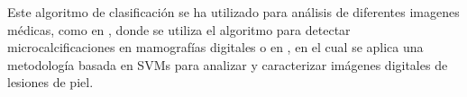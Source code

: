 Este algoritmo de clasificación  se ha utilizado para análisis de diferentes imagenes médicas, como en \citep{el2002support}, donde se utiliza el algoritmo para detectar  microcalcificaciones en mamografías digitales o en \citep{maglogiannis2004characterization}, en el cual se aplica una metodología basada en SVMs para analizar y caracterizar imágenes digitales de lesiones de piel.
